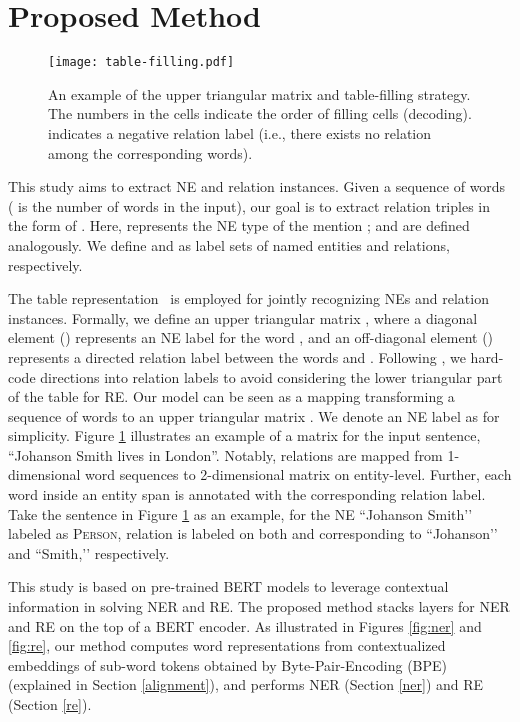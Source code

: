 \documentclass[11pt,a4paper]{article}
\begin{document}
\section{Proposed Method}

\label{method}

 \begin{figure}[t]
     \centering
     \texttt{[image: table-filling.pdf]}
     \caption{An example of the upper triangular matrix  and table-filling strategy. The numbers in the cells indicate the order of filling cells (decoding).  indicates a negative relation label (i.e., there exists no relation among the corresponding words). }
     \label{fig:example}
 \end{figure}

This study aims to extract NE and relation instances. Given a sequence of words  ( is the number of words in the input), our goal is to extract relation triples in the form of . Here,  represents the NE type of the mention ;  and  are defined analogously.
We define  and  as label sets of named entities and relations, respectively.

The table representation~\cite{miwa-sasaki-2014-modeling} is employed for jointly recognizing NEs and relation instances. Formally, we define an  upper triangular matrix , where a diagonal element  () represents an NE label for the word , and an off-diagonal element  () represents a directed relation label between the words  and . Following \citet{zhang-etal-2017-end}, we hard-code directions into relation labels  to avoid considering the lower triangular part of the table for RE.
Our model can be seen as a mapping transforming a sequence of words  to an upper triangular matrix . We denote an NE label as  for simplicity.
Figure \ref{fig:example} illustrates an example of a matrix  for the input sentence, ``Johanson Smith lives in London''. Notably, relations are mapped from 1-dimensional word sequences to 2-dimensional matrix  on entity-level. Further, each word inside an entity span is annotated with the corresponding relation label. Take the sentence in Figure \ref{fig:example} as an example, for the NE ``Johanson Smith’’ labeled as \textsc{Person}, relation  is labeled on both  and  corresponding to ``Johanson’’ and ``Smith,’’ respectively. 

This study is based on pre-trained BERT models to leverage contextual information in solving NER and RE. The proposed method stacks layers for NER and RE on the top of a BERT encoder.
As illustrated in Figures \ref{fig:ner} and \ref{fig:re}, our method computes word representations from contextualized embeddings of sub-word tokens obtained by Byte-Pair-Encoding (BPE) (explained in Section \ref{alignment}), and performs NER (Section \ref{ner}) and RE (Section \ref{re}).
\end{document}
